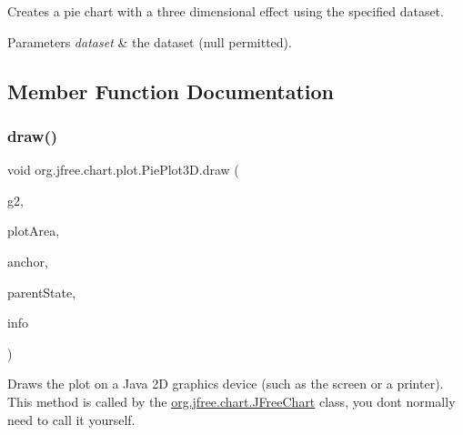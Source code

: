 Creates a pie chart with a three dimensional effect using the specified dataset.


\begin{DoxyParams}{Parameters}
{\em dataset} & the dataset ({\ttfamily null} permitted). \\
\hline
\end{DoxyParams}


\subsection{Member Function Documentation}
\mbox{\label{classorg_1_1jfree_1_1chart_1_1plot_1_1_pie_plot3_d_aec0a97c54aa5b9e3920d0180bdd5a49f}} 
\subsubsection{\texorpdfstring{draw()}{draw()}}
{\footnotesize\ttfamily void org.\+jfree.\+chart.\+plot.\+Pie\+Plot3\+D.\+draw (\begin{DoxyParamCaption}\item[{Graphics2D}]{g2,  }\item[{Rectangle2D}]{plot\+Area,  }\item[{Point2D}]{anchor,  }\item[{\mbox{\hyperlink{classorg_1_1jfree_1_1chart_1_1plot_1_1_plot_state}{Plot\+State}}}]{parent\+State,  }\item[{\mbox{\hyperlink{classorg_1_1jfree_1_1chart_1_1plot_1_1_plot_rendering_info}{Plot\+Rendering\+Info}}}]{info }\end{DoxyParamCaption})}

Draws the plot on a Java 2D graphics device (such as the screen or a printer). This method is called by the \mbox{\hyperlink{classorg_1_1jfree_1_1chart_1_1_j_free_chart}{org.\+jfree.\+chart.\+J\+Free\+Chart}} class, you don\textquotesingle{}t normally need to call it yourself.


